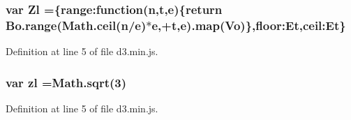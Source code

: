 \subsubsection[{Zl}]{\setlength{\rightskip}{0pt plus 5cm}var Zl =\{range\+:function({\bf n},t,{\bf e})\{{\bf return} {\bf Bo.\+range}(Math.\+ceil({\bf n}/{\bf e})$\ast${\bf e},+t,{\bf e}).{\bf map}({\bf Vo})\},floor\+:\+Et,ceil\+:\+Et\}}\label{d3_8min_8js_af7a96bf5d4dfdda60be127dac38398bf}


Definition at line 5 of file d3.\+min.\+js.

\subsubsection[{zl}]{\setlength{\rightskip}{0pt plus 5cm}var zl ={\bf Math.\+sqrt}(3)}\label{d3_8min_8js_a846c071534a9dbe7d40ceee9945aee59}


Definition at line 5 of file d3.\+min.\+js.

